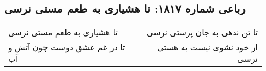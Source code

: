 \begin{center}
\section*{رباعی شماره ۱۸۱۷: تا هشیاری به طعم مستی نرسی}
\label{sec:1817}
\begin{longtable}{l p{0.5cm} r}
تا هشیاری به طعم مستی نرسی
&&
تا تن ندهی به جان پرستی نرسی
\\
تا در غم عشق دوست چون آتش و آب
&&
از خود نشوی نیست به هستی نرسی
\\
\end{longtable}
\end{center}
